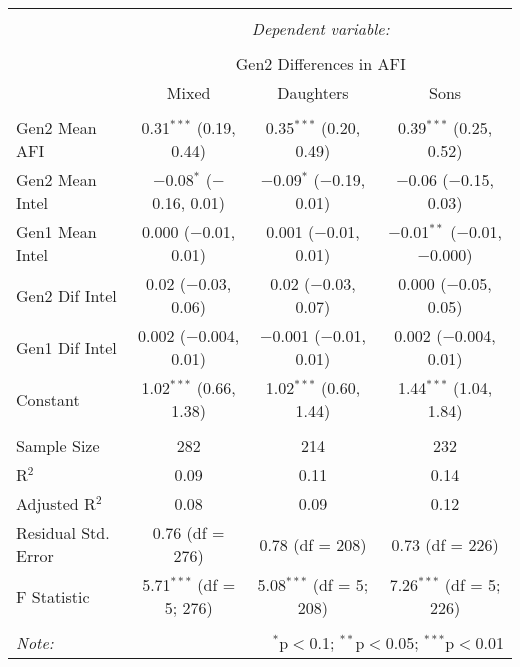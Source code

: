 
\begingroup 
\small 
\begin{tabular}{@{\extracolsep{1pt}}lccc} 
\\[-1.8ex]\hline 
\hline \\[-1.8ex] 
 & \multicolumn{3}{c}{\textit{Dependent variable:}} \\ 
\cline{2-4} 
\\[-1.8ex] & \multicolumn{3}{c}{Gen2 Differences in AFI} \\ 
 & Mixed & Daughters & Sons \\ 
\hline \\[-1.8ex] 
 Gen2 Mean AFI & 0.31$^{***}$ (0.19, 0.44) & 0.35$^{***}$ (0.20, 0.49) & 0.39$^{***}$ (0.25, 0.52) \\ 
  Gen2 Mean Intel & $-$0.08$^{*}$ ($-$0.16, 0.01) & $-$0.09$^{*}$ ($-$0.19, 0.01) & $-$0.06 ($-$0.15, 0.03) \\ 
  Gen1 Mean Intel & 0.000 ($-$0.01, 0.01) & 0.001 ($-$0.01, 0.01) & $-$0.01$^{**}$ ($-$0.01, $-$0.000) \\ 
  Gen2 Dif Intel & 0.02 ($-$0.03, 0.06) & 0.02 ($-$0.03, 0.07) & 0.000 ($-$0.05, 0.05) \\ 
  Gen1 Dif Intel & 0.002 ($-$0.004, 0.01) & $-$0.001 ($-$0.01, 0.01) & 0.002 ($-$0.004, 0.01) \\ 
  Constant & 1.02$^{***}$ (0.66, 1.38) & 1.02$^{***}$ (0.60, 1.44) & 1.44$^{***}$ (1.04, 1.84) \\ 
 \hline \\[-1.8ex] 
Sample Size & 282 & 214 & 232 \\ 
R$^{2}$ & 0.09 & 0.11 & 0.14 \\ 
Adjusted R$^{2}$ & 0.08 & 0.09 & 0.12 \\ 
Residual Std. Error & 0.76 (df = 276) & 0.78 (df = 208) & 0.73 (df = 226) \\ 
F Statistic & 5.71$^{***}$ (df = 5; 276) & 5.08$^{***}$ (df = 5; 208) & 7.26$^{***}$ (df = 5; 226) \\ 
\hline 
\hline \\[-1.8ex] 
\textit{Note:}  & \multicolumn{3}{r}{$^{*}$p$<$0.1; $^{**}$p$<$0.05; $^{***}$p$<$0.01} \\ 
\end{tabular} 
\endgroup 
